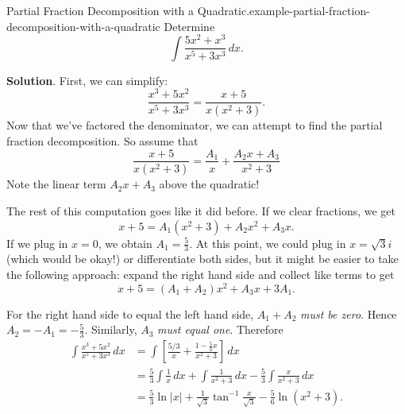 \documentclass[10pt,]{book}
\numberwithin{equation}{section}
\begin{document}
\begin{example}{Partial Fraction Decomposition with a Quadratic.}{example-partial-fraction-decomposition-with-a-quadratic}%
\hypertarget{p-560}{}%
Determine%
\begin{equation*}
\int\frac{5x^{2} + x^{3}}{x^{5} + 3x^{3}}\,dx.
\end{equation*}
%
\par\smallskip%
\noindent\textbf{Solution}.\hypertarget{solution-123}{}\quad%
\hypertarget{p-561}{}%
First, we can simplify:%
\begin{equation*}
\frac{x^{3} + 5x^{2}}{x^{5} + 3x^{3}} = \frac{x + 5}{x(x^{2} + 3)}.
\end{equation*}
Now that we've factored the denominator, we can attempt to find the partial fraction decomposition. So assume that%
\begin{equation*}
\frac{x + 5}{x(x^{2} + 3)} = \frac{A_{1}}{x} + \frac{A_{2}x + A_{3}}{x^{2} + 3}
\end{equation*}
Note the linear term \(A_{2}x + A_{3}\) above the quadratic!%
\par
\hypertarget{p-562}{}%
The rest of this computation goes like it did before. If we clear fractions, we get%
\begin{equation*}
x + 5 = A_{1}(x^{2} + 3) + A_{2}x^{2} + A_{3}x.
\end{equation*}
If we plug in \(x = 0\), we obtain \(A_{1} = \frac{5}{3}\). At this point, we could plug in \(x = \sqrt{3}i\) (which would be okay!) or differentiate both sides, but it might be easier to take the following approach: expand the right hand side and collect like terms to get%
\begin{equation*}
x + 5 = (A_{1} + A_{2})x^{2} + A_{3}x + 3A_{1}.
\end{equation*}
%
\par
\hypertarget{p-563}{}%
For the right hand side to equal the left hand side, \(A_{1} + A_{2}\) \emph{must be zero}. Hence \(A_{2} = -A_{1} = -\frac{5}{3}\). Similarly, \(A_{3}\) \emph{must equal one}. Therefore%
\begin{align*}
\int\frac{x^{3} + 5x^{2}}{x^{5} + 3x^{3}}\,dx & = \int\left[\frac{5/3}{x} + \frac{1 - \frac{5}{3}x}{x^{2} + 3}\right]\,dx \\
& = \frac{5}{3}\int\frac{1}{x}\,dx + \int\frac{1}{x^{2} + 3}\,dx - \frac{5}{3}\int\frac{x}{x^{2} + 3}\,dx \\
& = \frac{5}{3}\ln|x| + \frac{1}{\sqrt{3}}\tan^{-1}\frac{x}{\sqrt{3}} - \frac{5}{6}\ln(x^{2} + 3). 
\end{align*}
%
\end{example}
\end{document}
